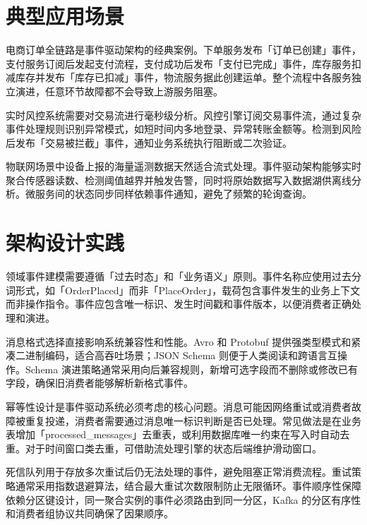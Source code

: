 \chapter{典型应用场景}
电商订单全链路是事件驱动架构的经典案例。下单服务发布「订单已创建」事件，支付服务订阅后发起支付流程，支付成功后发布「支付已完成」事件，库存服务扣减库存并发布「库存已扣减」事件，物流服务据此创建运单。整个流程中各服务独立演进，任意环节故障都不会导致上游服务阻塞。\par
实时风控系统需要对交易流进行毫秒级分析。风控引擎订阅交易事件流，通过复杂事件处理规则识别异常模式，如短时间内多地登录、异常转账金额等。检测到风险后发布「交易被拦截」事件，通知业务系统执行阻断或二次验证。\par
物联网场景中设备上报的海量遥测数据天然适合流式处理。事件驱动架构能够实时聚合传感器读数、检测阈值越界并触发告警，同时将原始数据写入数据湖供离线分析。微服务间的状态同步同样依赖事件通知，避免了频繁的轮询查询。\par
\chapter{架构设计实践}
领域事件建模需要遵循「过去时态」和「业务语义」原则。事件名称应使用过去分词形式，如「OrderPlaced」而非「PlaceOrder」，载荷包含事件发生的业务上下文而非操作指令。事件应包含唯一标识、发生时间戳和事件版本，以便消费者正确处理和演进。\par
消息格式选择直接影响系统兼容性和性能。Avro 和 Protobuf 提供强类型模式和紧凑二进制编码，适合高吞吐场景；JSON Schema 则便于人类阅读和跨语言互操作。Schema 演进策略通常采用向后兼容规则，新增可选字段而不删除或修改已有字段，确保旧消费者能够解析新格式事件。\par
幂等性设计是事件驱动系统必须考虑的核心问题。消息可能因网络重试或消费者故障被重复投递，消费者需要通过消息唯一标识判断是否已处理。常见做法是在业务表增加「processed\_{}messages」去重表，或利用数据库唯一约束在写入时自动去重。对于时间窗口类去重，可借助流处理引擎的状态后端维护滑动窗口。\par
死信队列用于存放多次重试后仍无法处理的事件，避免阻塞正常消费流程。重试策略通常采用指数退避算法，结合最大重试次数限制防止无限循环。事件顺序性保障依赖分区键设计，同一聚合实例的事件必须路由到同一分区，Kafka 的分区有序性和消费者组协议共同确保了因果顺序。\par
